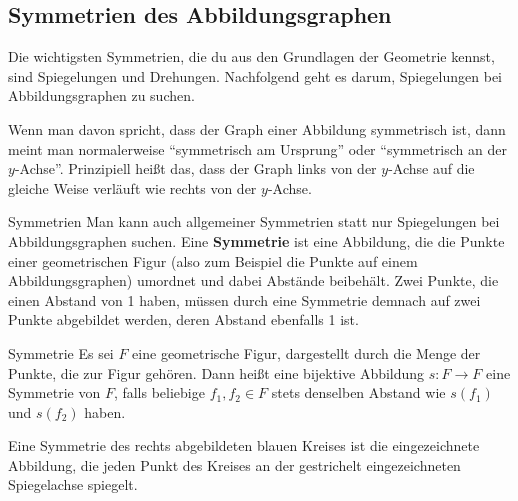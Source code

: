 \documentclass[../../main.tex]{subfiles}
\begin{document}
\subsection{Symmetrien des Abbildungsgraphen}
\label{sec:abbildungen_symmetrie}

Die wichtigsten Symmetrien, die du aus den Grundlagen der Geometrie kennst, sind Spiegelungen und Drehungen. Nachfolgend geht es darum, Spiegelungen bei Abbildungsgraphen zu suchen.

Wenn man davon spricht, dass der Graph einer Abbildung symmetrisch ist, dann meint man normalerweise \enquote{symmetrisch am Ursprung} oder \enquote{symmetrisch an der $y$-Achse}. Prinzipiell heißt das, dass der Graph links von der $y$-Achse auf die gleiche Weise verläuft wie rechts von der $y$-Achse.

\begin{advanced}{Symmetrien}
    Man kann auch allgemeiner Symmetrien statt nur Spiegelungen bei Abbildungsgraphen suchen. Eine \textbf{Symmetrie} ist eine Abbildung, die die Punkte einer geometrischen Figur (also zum Beispiel die Punkte auf einem Abbildungsgraphen) umordnet und dabei Abstände beibehält. Zwei Punkte, die einen Abstand von 1 haben, müssen durch eine Symmetrie demnach auf zwei Punkte abgebildet werden, deren Abstand ebenfalls 1 ist.
    
    \begin{definition}{Symmetrie}
        Es sei $F$ eine geometrische Figur, dargestellt durch die Menge der Punkte, die zur Figur gehören. Dann heißt eine bijektive Abbildung $s\colon F\rightarrow F$ eine Symmetrie von $F$, falls beliebige $f_1,f_2\in F$ stets denselben Abstand wie $s(f_1)$ und $s(f_2)$ haben.
    \end{definition}
    
    \begin{advexample}{}
        Eine Symmetrie des rechts abgebildeten blauen Kreises ist die eingezeichnete Abbildung, die jeden Punkt des Kreises an der gestrichelt eingezeichneten Spiegelachse spiegelt.
        

\end{advexample}
\end{advanced}
\end{document}
